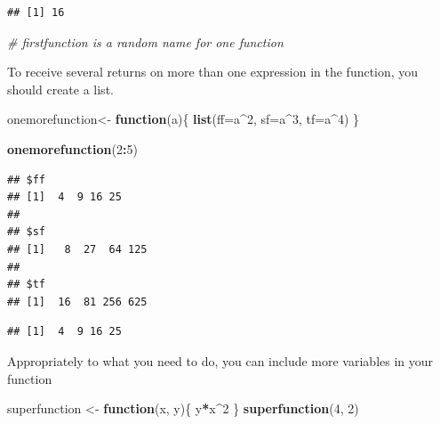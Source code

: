 \documentclass[]{report}
\newenvironment{Shaded}{\begin{snugshade}}{\end{snugshade}}
\newcommand{\KeywordTok}[1]{\textcolor[rgb]{0.13,0.29,0.53}{\textbf{#1}}}
\newcommand{\DataTypeTok}[1]{\textcolor[rgb]{0.13,0.29,0.53}{#1}}
\newcommand{\DecValTok}[1]{\textcolor[rgb]{0.00,0.00,0.81}{#1}}
\newcommand{\StringTok}[1]{\textcolor[rgb]{0.31,0.60,0.02}{#1}}
\newcommand{\CommentTok}[1]{\textcolor[rgb]{0.56,0.35,0.01}{\textit{#1}}}
\newcommand{\ControlFlowTok}[1]{\textcolor[rgb]{0.13,0.29,0.53}{\textbf{#1}}}
\newcommand{\OperatorTok}[1]{\textcolor[rgb]{0.81,0.36,0.00}{\textbf{#1}}}
\newcommand{\NormalTok}[1]{#1}
\begin{document}
\begin{verbatim}
## [1] 16
\end{verbatim}

\begin{Shaded}
\begin{Highlighting}[]
\CommentTok{# firstfunction is a random name for one function}
\end{Highlighting}
\end{Shaded}

To receive several returns on more than one expression in the function,
you should create a list.

\begin{Shaded}
\begin{Highlighting}[]
\NormalTok{onemorefunction<-}\StringTok{ }\ControlFlowTok{function}\NormalTok{(a)\{}
  \KeywordTok{list}\NormalTok{(}\DataTypeTok{ff=}\NormalTok{a}\OperatorTok{^}\DecValTok{2}\NormalTok{, }\DataTypeTok{sf=}\NormalTok{a}\OperatorTok{^}\DecValTok{3}\NormalTok{, }\DataTypeTok{tf=}\NormalTok{a}\OperatorTok{^}\DecValTok{4}\NormalTok{) }
\NormalTok{\}}

\KeywordTok{onemorefunction}\NormalTok{(}\DecValTok{2}\OperatorTok{:}\DecValTok{5}\NormalTok{)}
\end{Highlighting}
\end{Shaded}

\begin{verbatim}
## $ff
## [1]  4  9 16 25
## 
## $sf
## [1]   8  27  64 125
## 
## $tf
## [1]  16  81 256 625
\end{verbatim}

\begin{Shaded}
\end{Shaded}

\begin{verbatim}
## [1]  4  9 16 25
\end{verbatim}

Appropriately to what you need to do, you can include more variables in
your function

\begin{Shaded}
\begin{Highlighting}[]
\NormalTok{superfunction <-}\StringTok{ }\ControlFlowTok{function}\NormalTok{(x, y)\{}
\NormalTok{  y}\OperatorTok{*}\NormalTok{x}\OperatorTok{^}\DecValTok{2}
\NormalTok{\}}
\KeywordTok{superfunction}\NormalTok{(}\DecValTok{4}\NormalTok{, }\DecValTok{2}\NormalTok{)}
\end{Highlighting}
\end{Shaded}
\end{document}
